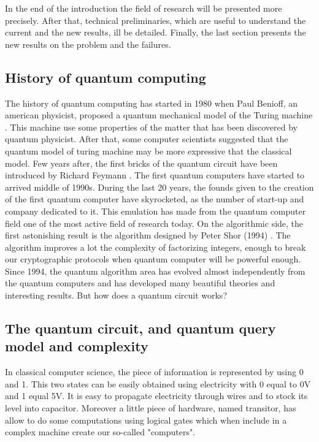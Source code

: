 In the end of the introduction the field of research will be presented more precisely.
After that, technical preliminaries, which are useful to understand the
current and the new results, ill be detailed. Finally, the last section presents the
new results on the problem and the failures.

\subsection{History of quantum computing}

The history of quantum computing has started in 1980 when Paul Benioff, an american physicist,
proposed a quantum mechanical model of the Turing machine \cite{art:paulbenioff}.
This machine use some properties
of the matter that has been discovered by quantum physicist. After that, some computer
scientists suggested that the quantum model of turing machine may be more expressive that the
classical model. Few years after, the first bricks of the quantum circuit have been introduced
by Richard Feymann \cite{art:feymann}. The first quantum computers have started to arrived middle
of 1990s. During the last 20 years, the founds given to the creation of the first quantum computer
have skyrocketed, as the number of start-up and company dedicated to it. This emulation has made
from the quantum computer
field one of the most active field of research today. On the algorithmic side, the first
astonishing result is the algorithm designed by Peter Shor (1994) \cite{art:shor}. The
algorithm improves a lot the complexity of factorizing integers, enough to break our
cryptographic protocols when quantum computer will be powerful enough. Since 1994, the
quantum algorithm area has evolved almost independently from the quantum computers and
has developed many beautiful theories and interesting results. But how does a quantum
circuit works?

\subsection{The quantum circuit, and quantum query model and complexity}

In classical computer science, the piece of information is represented by using
0 and 1. This two states can be easily obtained using electricity with 0 equal to 0V
and 1 equal 5V. It is easy to propagate electricity through wires and to stock its
level into capacitor. Moreover a little piece of hardware, named transitor, has allow to do some
computations using logical gates which when include in a complex machine create our
so-called "computers".


